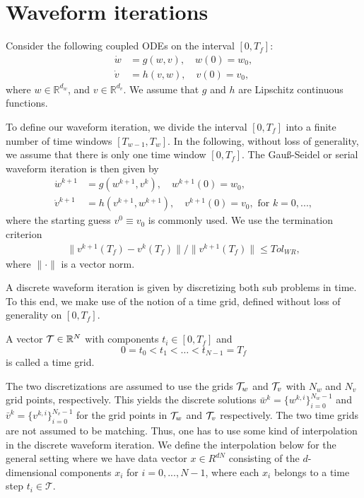 \section{Waveform iterations}

Consider the following coupled ODEs on the interval $[0,T_f]$:
\begin{align*}
	\dot{w} &= g(w, v), \quad w(0) = w_0, \\
	\dot{v} &= h(v, w), \quad v(0) = v_0, 
\end{align*}
where $w \in \mathbb{R}^{d_w}$, and $v \in \mathbb{R}^{d_v}$. We assume that $g$ and $h$ are Lipschitz continuous functions.

To define our waveform iteration, we divide the interval $[0,T_f]$ into a finite number of time windows $[T_{w-1},T_w]$. In the following, without loss of generality, we assume that there is only one time window $[0,T_f]$. The Gau\ss -Seidel or serial waveform iteration is then given by  
\begin{align*}
	\dot{w}^{k+1} &= g(w^{k+1}, v^{k}), \quad w^{k+1}(0) = w_0 ,\\
	\dot{v}^{k+1} &= h(v^{k+1}, w^{k+1}) , \quad v^{k+1}(0) = v_0, \text{ for } k=0, ...,
\end{align*}  
where the starting guess $v^0 \equiv v_0$ is commonly used. We use the termination criterion 
\begin{align}\label{Conv-crit}
	\|v^{k+1}(T_{f})-v^{k}(T_{f})\|/\|v^{k+1}(T_{f})\| \leq Tol_{WR},
\end{align} where $\|\cdot\|$ is a vector norm. 

A discrete waveform iteration is given by discretizing both sub problems in time. To this end, we make use of the notion of a time grid, defined without loss of generality on $[0,T_f]$.

\begin{definition}
	A vector ${\cal T}\in\mathbb{R}^N$ with components $t_i\in[0,T_f]$ and
	\[0=t_0<t_1<\hdots<t_{N-1}=T_f\]
	is called a time grid. 
\end{definition}

The two discretizations are assumed to use the grids ${\cal T}_w$ and ${\cal T}_v$ with $N_w$ and $N_v$ grid points, respectively. This yields the discrete solutions $\bar{w}^{k} =\{w^{k,i}\}_{i=0}^{N_w-1}$ and $\bar{v}^{k} =\{v^{k,i}\}_{i=0}^{N_v-1}$ for the grid points in ${\cal T}_w$ and ${\cal T}_v$ respectively. The two time grids are not assumed to be matching. Thus, one has to use some kind of interpolation in the discrete waveform iteration. We define the interpolation below for the general setting where we have  data vector $x \in R^{dN}$ consisting of the $d$-dimensional components $x_i$ for $i = 0,...,N-1$, where each $x_i$ belongs to a time step $t_i \in \mathcal{T}$.

